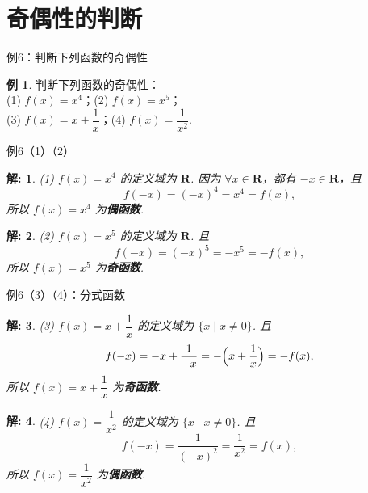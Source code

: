 \documentclass[aspectratio=169,13pt,t] {beamer}
\newtheorem*{solve}{解:}
\theoremstyle{definition}
\newtheorem{exam}{例}
\begin{document}
\section{奇偶性的判断}

\begin{frame}{例6：判断下列函数的奇偶性}
	\setcounter{exam}{5}
	\begin{exam}
	判断下列函数的奇偶性：\\
	(1) \(f(x)=x^4\)；\qquad\qquad(2) \(f(x)=x^5\)；\\
	(3) \(f(x)=x+\dfrac{1}{x}\)；\qquad (4) \(f(x)=\dfrac{1}{x^2}\).
	\end{exam}
	\vspace{0.3em}
\end{frame}

\begin{frame}{例6（1）（2）}
	\begin{solve}
	(1) \(f(x)=x^4\) 的定义域为 \(\mathbf{R}\). 因为 \(\forall x\in\mathbf{R}\)，都有 \(-x\in\mathbf{R}\)，且
	\[
		f(-x)=(-x)^4=x^4=f(x),
	\]
	所以 \(f(x)=x^4\) 为\textbf{偶函数}.
	\end{solve}
	\vspace{0.3em}
	\pause
	\begin{solve}
	(2) \(f(x)=x^5\) 的定义域为 \(\mathbf{R}\). 且
	\[
		f(-x)=(-x)^5=-x^5=-f(x),
	\]
	所以 \(f(x)=x^5\) 为\textbf{奇函数}.
	\end{solve}
\end{frame}

\begin{frame}{例6（3）（4）：分式函数}\vspace{-1.5em}
	\begin{solve}
	(3) \(f(x)=x+\dfrac{1}{x}\) 的定义域为 \(\{x\mid x\neq 0\}\). 且
	\[
		f(-x)=-x+\frac{1}{-x}=-\Bigl(x+\frac{1}{x}\Bigr)=-f(x),
	\]
	所以 \(f(x)=x+\dfrac{1}{x}\) 为\textbf{奇函数}.
	\end{solve}
	\vspace{-1em}
	\pause
	\begin{solve}
	(4) \(f(x)=\dfrac{1}{x^2}\) 的定义域为 \(\{x\mid x\neq 0\}\). 且
	\[
		f(-x)=\frac{1}{(-x)^2}=\frac{1}{x^2}=f(x),
	\]
	所以 \(f(x)=\dfrac{1}{x^2}\) 为\textbf{偶函数}.
	\end{solve}
\end{frame}
\end{document}

